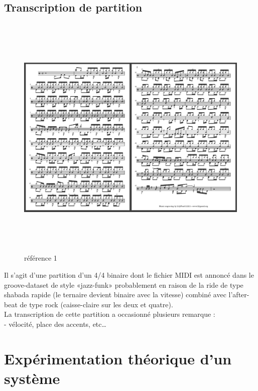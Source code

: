 \subsection{Transcription de partition}
\begin{figure}[h]
	\includegraphics[height=120mm, width=160mm]{z_images/4_experimentations/experience_1/partition.png}
	\caption{référence 1}
\end{figure}
Il s’agit d’une partition d’un 4/4 binaire dont le fichier MIDI est annoncé dans le groove-dataset de style «jazz-funk» probablement en raison de la ride de type shabada rapide (le ternaire devient binaire avec la vitesse) combiné avec l’after-beat de type rock (caisse-claire sur les deux et quatre).\\
La transcription de cette partition a occasionné plusieurs remarque :\\
- vélocité, place des accents, etc…
\section{Expérimentation théorique d’un système}
